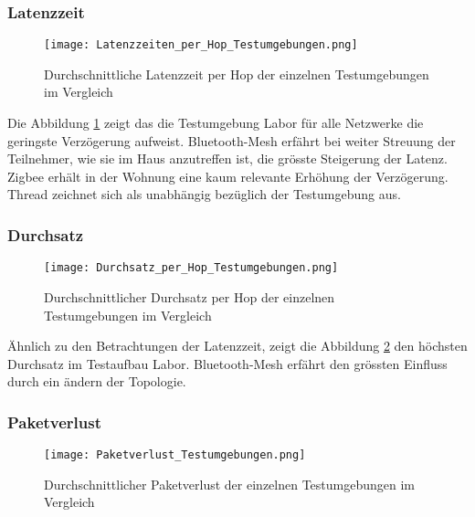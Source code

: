 \subsubsection{Latenzzeit}\label{subsec:VergleichLatenzzeitTestumgebungen}


\begin{figure}[H]
	\centering
	\texttt{[image: Latenzzeiten\_per\_Hop\_Testumgebungen.png]}
	\caption{Durchschnittliche Latenzzeit per Hop der einzelnen Testumgebungen im Vergleich}\label{fig:Latenzzeiten_per_Hop_Testumgebungen}
\end{figure}

Die Abbildung \ref{fig:Latenzzeiten_per_Hop_Testumgebungen} zeigt das die Testumgebung Labor für alle Netzwerke die geringste Verzögerung aufweist. Bluetooth-Mesh erfährt bei weiter Streuung der Teilnehmer, wie sie im Haus anzutreffen ist, die grösste Steigerung der Latenz. Zigbee erhält in der Wohnung eine kaum relevante Erhöhung der Verzögerung. Thread zeichnet sich als unabhängig bezüglich der Testumgebung aus. 

\subsubsection{Durchsatz}\label{subsec:VergleichDurchsatzTestumgebungen}


\begin{figure}[H]
	\centering
	\texttt{[image: Durchsatz\_per\_Hop\_Testumgebungen.png]}
	\caption{Durchschnittlicher Durchsatz per Hop der einzelnen Testumgebungen im Vergleich}\label{fig:Durchsätze_per_Hop_Testumgebungen}
\end{figure}

Ähnlich zu den Betrachtungen der Latenzzeit, zeigt die Abbildung \ref{fig:Durchsätze_per_Hop_Testumgebungen} den höchsten Durchsatz im Testaufbau Labor. Bluetooth-Mesh erfährt den grössten Einfluss durch ein ändern der Topologie. 

\subsubsection{Paketverlust}\label{subsec:VergleichPaketverlustTestumgebungen}


\begin{figure}[H]
	\centering
	\texttt{[image: Paketverlust\_Testumgebungen.png]}
	\caption{Durchschnittlicher Paketverlust der einzelnen Testumgebungen im Vergleich}\label{fig:PaketverlusteTestumgebungen}
\end{figure}

